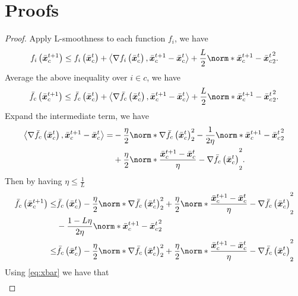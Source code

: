 \documentclass{article}
\begin{document}
\section{Proofs}
\begin{proof}
  Apply L-smoothness to each function $f_i$, we have
  \begin{align*}
    f_i\left(\bar{\xx}_c^{t+1}\right) \le f_i\left(\bar{\xx}_c^{t}\right) 
    + \left\langle \nabla f_i\left(\bar{\xx}_c^{t}\right), \bar{\xx}_c^{t+1} - \bar{\xx}_c^{t}\right\rangle
    + \frac{L}{2} \norm*{\bar{\xx}_c^{t+1} - \bar{\xx}_c^{t}}_2^2.
  \end{align*}
  Average the above inequality over $i\in c$, we have
  \begin{align*}
    \bar{f}_c\left(\bar{\xx}_c^{t+1}\right) \le \bar{f}_c\left(\bar{\xx}_c^{t}\right) 
    + \left\langle \nabla \bar{f}_c\left(\bar{\xx}_c^{t}\right), \bar{\xx}_c^{t+1} - \bar{\xx}_c^{t}\right\rangle
    + \frac{L}{2} \norm*{\bar{\xx}_c^{t+1} - \bar{\xx}_c^{t}}_2^2.
  \end{align*}
  Expand the intermediate term, we have 
  \begin{align*}
    \left\langle \nabla \bar{f}_c\left(\bar{\xx}_c^{t}\right), \bar{\xx}_c^{t+1} - \bar{\xx}_c^{t}\right\rangle=& - \frac{\eta}{2} \norm*{\nabla \bar{f}_c\left(\bar{\xx}_c^{t}\right) }_2^2 - \frac{1}{2\eta} \norm*{ \bar{\xx}_c^{t+1} - \bar{\xx}_c^{t} }_2^2 \\
    &+ \frac{\eta}{2} \norm*{\frac{\bar{\xx}_c^{t+1} - \bar{\xx}_c^{t}}{\eta} - \nabla \bar{f}_c\left(\bar{\xx}_c^{t}\right)}_2^2.
  \end{align*}
  Then by having $\eta\le \frac{1}{L}$
  \begin{align*}
    \bar{f}_c\left(\bar{\xx}_c^{t+1}\right) \le& \bar{f}_c\left(\bar{\xx}_c^{t}\right) 
    - \frac{\eta}{2} \norm*{\nabla \bar{f}_c\left(\bar{\xx}_c^{t}\right) }_2^2
    + \frac{\eta}{2} \norm*{\frac{\bar{\xx}_c^{t+1} - \bar{\xx}_c^{t}}{\eta} - \nabla \bar{f}_c\left(\bar{\xx}_c^{t}\right)}_2^2 \\
    &- \frac{1-L\eta}{2\eta} \norm*{ \bar{\xx}_c^{t+1} - \bar{\xx}_c^{t} }_2^2 \\
    \le& \bar{f}_c\left(\bar{\xx}_c^{t}\right) 
    - \frac{\eta}{2} \norm*{\nabla \bar{f}_c\left(\bar{\xx}_c^{t}\right) }_2^2
    + \frac{\eta}{2} \norm*{\frac{\bar{\xx}_c^{t+1} - \bar{\xx}_c^{t}}{\eta} - \nabla \bar{f}_c\left(\bar{\xx}_c^{t}\right)}_2^2
  \end{align*}
  Using \eqref{eq:xbar} we have that
  \begin{align*}

\end{align*}
\end{proof}
\end{document}
